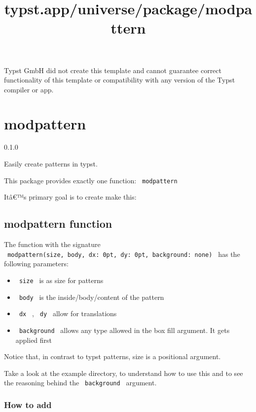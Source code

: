 Typst GmbH did not create this template and cannot guarantee correct
functionality of this template or compatibility with any version of the
Typst compiler or app.


\title{typst.app/universe/package/modpattern}

\label{banner}
\section{modpattern}\label{modpattern}

{ 0.1.0 }

Easily create patterns in typst.

\label{readme}
This package provides exactly one function: \texttt{\ modpattern\ }

Itâ€™s primary goal is to create make this:

\subsection{modpattern function}\label{modpattern-function}

The function with the signature
\texttt{\ modpattern(size,\ body,\ dx:\ 0pt,\ dy:\ 0pt,\ background:\ none)\ }
has the following parameters:

\begin{itemize}
\tightlist
\item
  \texttt{\ size\ } is as size for patterns
\item
  \texttt{\ body\ } is the inside/body/content of the pattern
\item
  \texttt{\ dx\ } , \texttt{\ dy\ } allow for translations
\item
  \texttt{\ background\ } allows any type allowed in the box fill
  argument. It gets applied first
\end{itemize}

Notice that, in contrast to typst patterns, size is a positional
argument.

Take a look at the example directory, to understand how to use this and
to see the reasoning behind the \texttt{\ background\ } argument.

\subsubsection{How to add}\label{how-to-add}

